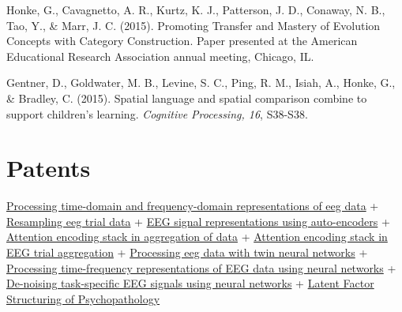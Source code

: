 \documentclass[11pt,]{article}
\begin{document}
Honke, G., Cavagnetto, A. R., Kurtz, K. J., Patterson, J. D., Conaway,
N. B., Tao, Y., \& Marr, J. C. (2015). Promoting Transfer and Mastery of
Evolution Concepts with Category Construction. Paper presented at the
American Educational Research Association annual meeting, Chicago, IL.

Gentner, D., Goldwater, M. B., Levine, S. C., Ping, R. M., Isiah, A.,
Honke, G., \& Bradley, C. (2015). Spatial language and spatial
comparison combine to support children's learning. \emph{Cognitive
Processing, 16}, S38-S38.

\section{Patents}\label{patents}

\href{https://scholar.google.com/citations?view_op=view_citation\&hl=en\&user=WPewiKcAAAAJ\&sortby=pubdate\&citation_for_view=WPewiKcAAAAJ:WbkHhVStYXYC}{Processing
time-domain and frequency-domain representations of eeg data} +
\href{https://scholar.google.com/citations?view_op=view_citation\&hl=en\&user=WPewiKcAAAAJ\&sortby=pubdate\&citation_for_view=WPewiKcAAAAJ:Tiz5es2fbqcC}{Resampling
eeg trial data} +
\href{https://scholar.google.com/citations?view_op=view_citation\&hl=en\&user=WPewiKcAAAAJ\&sortby=pubdate\&citation_for_view=WPewiKcAAAAJ:u9iWguZQMMsC}{EEG
signal representations using auto-encoders} +
\href{https://scholar.google.com/citations?view_op=view_citation\&hl=en\&user=WPewiKcAAAAJ\&sortby=pubdate\&citation_for_view=WPewiKcAAAAJ:XiSMed-E-HIC}{Attention
encoding stack in aggregation of data} +
\href{https://scholar.google.com/citations?view_op=view_citation\&hl=en\&user=WPewiKcAAAAJ\&sortby=pubdate\&citation_for_view=WPewiKcAAAAJ:p2g8aNsByqUC}{Attention
encoding stack in EEG trial aggregation} +
\href{https://scholar.google.com/citations?view_op=view_citation\&hl=en\&user=WPewiKcAAAAJ\&sortby=pubdate\&citation_for_view=WPewiKcAAAAJ:OU6Ihb5iCvQC}{Processing
eeg data with twin neural networks} +
\href{https://scholar.google.com/citations?view_op=view_citation\&hl=en\&user=WPewiKcAAAAJ\&sortby=pubdate\&citation_for_view=WPewiKcAAAAJ:uWQEDVKXjbEC}{Processing
time-frequency representations of EEG data using neural networks} +
\href{https://scholar.google.com/citations?view_op=view_citation\&hl=en\&user=WPewiKcAAAAJ\&sortby=pubdate\&citation_for_view=WPewiKcAAAAJ:SP6oXDckpogC}{De-noising
task-specific EEG signals using neural networks} +
\href{https://scholar.google.com/citations?view_op=view_citation\&hl=en\&user=WPewiKcAAAAJ\&sortby=pubdate\&citation_for_view=WPewiKcAAAAJ:UxriW0iASnsC}{Latent
Factor Structuring of Psychopathology}
\end{document}
